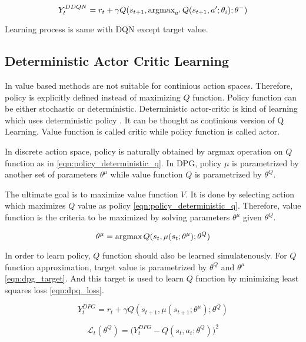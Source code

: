 \begin{equation}
\label{eqn:ddqn_ntarget}
Y_t^{DDQN} = r_t + \gamma Q(s_{t+1}, \operatorname{\textup{argmax}}_{a'} Q(s_{t+1}, a'; \theta_i );\theta^-)
\end{equation}

Learning process is same with DQN except target value.

\subsection{Deterministic Actor Critic Learning}
In value based methods are not suitable for continious action spaces. Therefore, policy is explicitly defined instead of maximizing $Q$ function. Policy function can be either stochastic or deterministic.  Deterministic actor-critic is kind of learning which uses deterministic policy \cite{silver_deterministic_2014}. It can be thought as continious version of Q Learning. Value function is called critic while policy function is called actor.

In discrete action space, policy is naturally obtained by argmax operation on $Q$ function as in \ref{eqn:policy_deterministic_q}. In DPG, policy $\mu$ is parametrized by another set of parameters $\theta^\mu$ while value function $Q$ is parametrized by $\theta^Q$. 

The ultimate goal is to maximize value function $V$. It is done by selecting action which maximizes $Q$ value as policy \ref{eqn:policy_deterministic_q}. Therefore, value function is the criteria to be maximized by solving parameters $\theta^\mu$ given $\theta^Q$. 

\begin{equation}
\label{eqn:dpg_value_maximization}
\theta^\mu = \operatorname{\textup{argmax}} Q(s_t, \mu(s_t;\theta^\mu);\theta^Q)
\end{equation}

In order to learn policy, $Q$ function should also be learned simulatenously. For $Q$ function approximation, target value is parametrized by $\theta^Q$ and $\theta^\mu$ \ref{eqn:dpg_target}. And this target is used to learn $Q$ function by minimizing least squares loss \ref{eqn:dpq_loss}.

\begin{equation}
\label{eqn:dpg_target}
Y_t^{DPG} = r_t + \gamma Q(s_{t+1}, \mu(s_{t+1};\theta^\mu);\theta^Q)
\end{equation}

\begin{equation}
\label{eqn:dpq_loss}
\mathcal{L}_t(\theta^Q) = \big( Y_t^{DPG} - Q(s_t,a_t;\theta^Q) \big) ^ 2
\end{equation}


